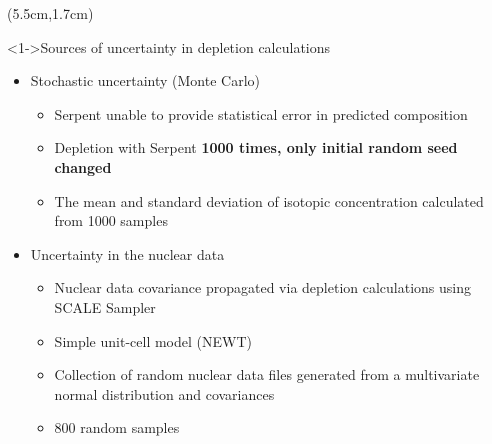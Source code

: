 \begin{frame}
\begin{textblock*}{12.4cm}
\begin{columns}
		\column[t]{6cm}
		\begin{textblock*}{7.2cm}(5.5cm,1.7cm) %
			\begin{block}<1->{Sources of uncertainty in depletion calculations}
				\begin{itemize}
					\itemsep=0.3em
					\item<3> Stochastic uncertainty (Monte Carlo)
					\begin{itemize}
						\itemsep=0.5em
						\item Serpent unable to provide statistical error in 
						predicted composition
						\item Depletion with Serpent \textbf{1000 times, only 
							initial random seed changed}
						\item The mean and standard deviation of isotopic 
						concentration calculated from 1000 samples
					\end{itemize}
					
					\item<1-> Uncertainty in the nuclear data
					\begin{itemize}
						\itemsep=0.5em
						\item Nuclear data covariance propagated via 
						depletion calculations using SCALE Sampler
						\item Simple unit-cell model (NEWT)
						\item Collection of random nuclear data files 
						generated from a multivariate normal distribution and 
						covariances
						\item 800 random samples
					\end{itemize} 
				\end{itemize}
			\end{block}
				
		\end{textblock*}
		
	\end{columns}
\end{textblock*}
\end{frame}